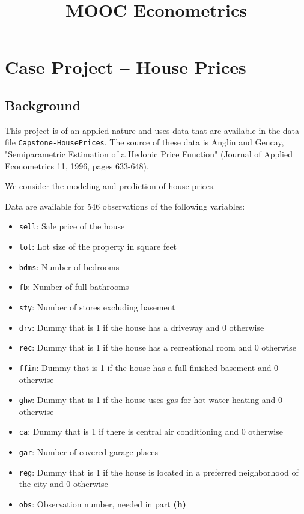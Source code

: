 \documentclass[11pt]{article}
\title{MOOC Econometrics}
\date{}
\providecommand{\tightlist}{%
      \setlength{\itemsep}{0pt}\setlength{\parskip}{0pt}}
\begin{document}
    
    
    \maketitle
    
    

    
    \section{Case Project -- House Prices}\label{case-project-house-prices}

\subsection{Background}\label{background}

This project is of an applied nature and uses data that are available in
the data file \texttt{Capstone-HousePrices}. The source of these data is
Anglin and Gencay, "Semiparametric Estimation of a Hedonic Price
Function" (Journal of Applied Econometrics 11, 1996, pages 633-648).

We consider the modeling and prediction of house prices.

Data are available for 546 observations of the following variables:

\begin{itemize}
\tightlist
\item
  \texttt{sell}: Sale price of the house
\item
  \texttt{lot}: Lot size of the property in square feet
\item
  \texttt{bdms}: Number of bedrooms
\item
  \texttt{fb}: Number of full bathrooms
\item
  \texttt{sty}: Number of stores excluding basement
\item
  \texttt{drv}: Dummy that is 1 if the house has a driveway and 0
  otherwise
\item
  \texttt{rec}: Dummy that is 1 if the house has a recreational room and
  0 otherwise
\item
  \texttt{ffin}: Dummy that is 1 if the house has a full finished
  basement and 0 otherwise
\item
  \texttt{ghw}: Dummy that is 1 if the house uses gas for hot water
  heating and 0 otherwise
\item
  \texttt{ca}: Dummy that is 1 if there is central air conditioning and
  0 otherwise
\item
  \texttt{gar}: Number of covered garage places
\item
  \texttt{reg}: Dummy that is 1 if the house is located in a preferred
  neighborhood of the city and 0 otherwise
\item
  \texttt{obs}: Observation number, needed in part \textbf{(h)}
\end{itemize}
\end{document}
